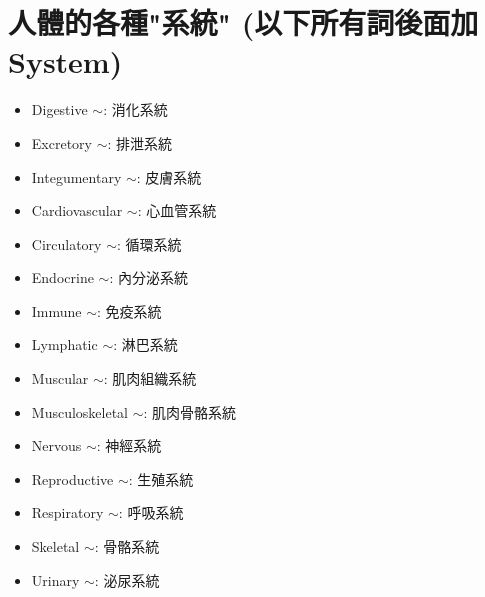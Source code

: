 \section{人體的各種"系統" (以下所有詞後面加System)}
\begin{multicols}{3}
\begin{itemize}
  \itemsep0em
  \item Digestive $\sim$: 消化系統 
  \item Excretory $\sim$: 排泄系統
  \item Integumentary $\sim$: 皮膚系統
  \item Cardiovascular $\sim$: 心血管系統
  \item Circulatory $\sim$: 循環系統
  \item Endocrine $\sim$: 內分泌系統
  \item Immune $\sim$: 免疫系統
  \item Lymphatic $\sim$: 淋巴系統
  \item Muscular $\sim$: 肌肉組織系統
  \item Musculoskeletal $\sim$: 肌肉骨骼系統
  \item Nervous $\sim$: 神經系統
  \item Reproductive $\sim$: 生殖系統
  \item Respiratory $\sim$: 呼吸系統
  \item Skeletal $\sim$: 骨骼系統
  \item Urinary $\sim$: 泌尿系統
\end{itemize}
\end{multicols}

